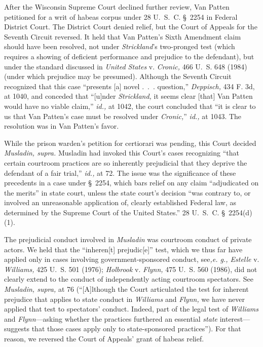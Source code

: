   After the Wisconsin Supreme Court declined further review, Van Patten petitioned for a writ of habeas corpus under 28 U.~S.~C. \S~2254 in Federal District Court. The District Court denied relief, but the Court of Appeals for the Seventh Circuit reversed. It held that Van Patten's Sixth Amendment claim should have been resolved, not under \emph{Strickland}'s two-pronged test (which requires a showing of deficient performance and prejudice to the defendant), but under the standard discussed in \emph{United States} v. \emph{Cronic,} 466 U.~S. 648 (1984) (under which prejudice may be presumed). Although the Seventh Circuit recognized that this case ``presents [a] novel .~.~. question,'' \emph{Deppisch,} 434 F. 3d, at 1040, and conceded that ``[u]nder \emph{Strickland,} it seems clear [that] Van Patten would have no viable claim,'' \emph{id.,} at 1042, the court concluded that ``it is clear to us that Van Patten's case must be resolved under \emph{Cronic,}'' \emph{id.,} at 1043. The resolution was in Van Patten's favor.

  \newpage While the prison warden's petition for certiorari was pending, this Court decided \emph{Musladin, supra.} Musladin had invoked this Court's cases recognizing ``that certain courtroom practices are so inherently prejudicial that they deprive the defendant of a fair trial,'' \emph{id.,} at 72. The issue was the significance of these precedents in a case under \S~2254, which bars relief on any claim ``adjudicated on the merits'' in state court, unless the state court's decision ``was contrary to, or involved an unreasonable application of, clearly established Federal law, as determined by the Supreme Court of the United States.'' 28 U.~S.~C. \S~2254(d)(1).

  The prejudicial conduct involved in \emph{Musladin} was courtroom conduct of private actors. We held that the ``inheren[t] prejudic[e]'' test, which we thus far have applied only in cases involving government-sponsored conduct, see\emph{,e. g., Estelle} v. \emph{Williams,} 425 U.~S. 501 (1976); \emph{Holbrook} v. \emph{Flynn,} 475 U.~S. 560 (1986), did not clearly extend to the conduct of independently acting courtroom spectators. See \emph{Musladin, supra,} at 76 (``[A]lthough the Court articulated the test for inherent prejudice that applies to state conduct in \emph{Williams} and \emph{Flynn,} we have never applied that test to spectators' conduct. Indeed, part of the legal test of \emph{Williams} and \emph{Flynn}---asking whether the practices furthered an essential \emph{state} interest---suggests that those cases apply only to state-sponsored practices''). For that reason, we reversed the Court of Appeals' grant of habeas relief.


